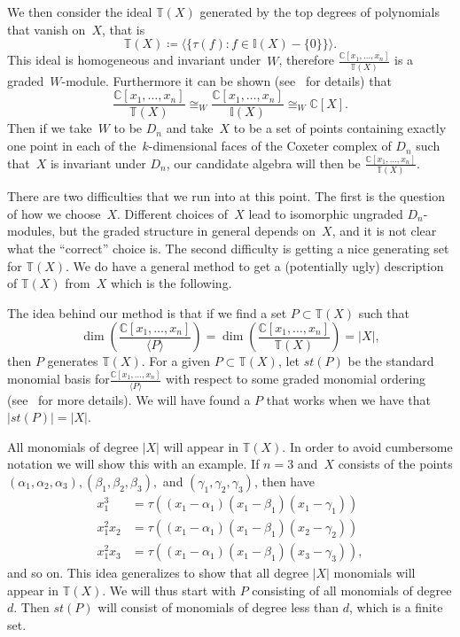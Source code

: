 \documentclass[ALCO,ThmDefs,Unicode,epreuves]{cedram}
\begin{document}
We then consider the ideal $\mathbb{T}(X)$ generated by the top degrees of polynomials that vanish on~$X$, that 
is
\begin{equation}
\mathbb{T}(X)\coloneqq \langle\{\tau(f):f\in \mathbb{I}(X)-\{0\} \}\rangle.
\end{equation}
 This ideal is homogeneous 
and invariant under~$W$, therefore $\frac{\mathbb{C}[x_1,\ldots, x_n]}{\mathbb{T}(X)}$ is a graded~$W$-module. Furthermore 
it can be shown (see~\cite{GP} for details) that
\begin{equation}
\frac{\mathbb{C}[x_1,\ldots, x_n]}{\mathbb{T}(X)}\cong_W 
\frac{\mathbb{C}[x_1,\ldots, x_n]}{\mathbb{I}(X)}\cong_W \mathbb{C}[X].
\end{equation}
 Then if we take~$W$ to be $D_n$ and take~$X$ to be a set of points containing exactly one point in each of the~$k$-dimensional faces of the Coxeter complex of $D_n$ 
such that~$X$ is invariant under $D_n$, our candidate algebra will then be $\frac{\mathbb{C}[x_1,\ldots, x_n]}{\mathbb{T}(X)}$.


There are two difficulties that we run into at this point. The first is the question of how we choose~$X$. Different choices 
of~$X$ lead to isomorphic ungraded $D_n$-modules, but the graded structure in general depends on~$X$, and it is not clear 
what the ``correct'' choice is. The second difficulty is getting a nice generating set for $\mathbb{T}(X)$. We do have a 
general method to get a (potentially ugly) description of $\mathbb{T}(X)$ from~$X$ which is the following.

The idea behind our method is that if we find a set $P\subset \mathbb{T}(X)$ such 
that
\begin{equation}
\dim\left(\frac{\mathbb{C}[x_1,\ldots, x_n]}{\langle P\rangle}\right)=\dim \left(\frac{\mathbb{C}[x_1,\ldots, 
x_n]}{\mathbb{T}(X)}\right)=\vert X\vert,
\end{equation}
then $P$ generates $\mathbb{T}(X)$. For a given $P\subset 
\mathbb{T}(X)$, let $st(P)$ be the standard monomial basis for$\frac{\mathbb{C}[x_1,\ldots, x_n]}{\langle P\rangle}$ with 
respect to some graded monomial ordering (see~\cite{Gr} for more details). We will have found a $P$ that works when we have 
that $\vert st(P)\vert=\vert X\vert$. 

	All monomials of degree $\vert X\vert$ will appear in $\mathbb{T}(X)$. In order to avoid cumbersome notation we will show 
this with an example. If $n=3$ and~$X$ consists of the points $(\alpha_1,\alpha_2,\alpha_3), (\beta_1,\beta_2,\beta_3),$ 
and $(\gamma_1,\gamma_2,\gamma_3)$, then have 
\begin{align}
x_1^3&=\tau((x_1-\alpha_1)(x_1-\beta_1)(x_1-\gamma_1))\\ 
x_1^2x_2&=\tau((x_1-\alpha_1)(x_1-\beta_1)(x_2-\gamma_2))\\ 
x_1^2x_3&=\tau((x_1-\alpha_1)(x_1-\beta_1)(x_3-\gamma_3)),
\end{align} 
and so on.
This idea generalizes to show that all degree $\vert X\vert$ monomials will appear in $\mathbb{T}(X)$. We will thus start with 
$P$ consisting of all monomials of degree $d$. Then $st(P)$ will consist of monomials of degree less than $d$, which is a 
finite set.
\end{document}
